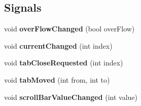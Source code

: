 \subsection*{Signals}
\begin{DoxyCompactItemize}
\item 
\hypertarget{class_combo_tab_bar_a94f5ffd04222be4711aa86c43dd8c2c8}{
void {\bfseries overFlowChanged} (bool overFlow)}
\label{class_combo_tab_bar_a94f5ffd04222be4711aa86c43dd8c2c8}

\item 
\hypertarget{class_combo_tab_bar_a809f0e76133375268a91fab6764f8974}{
void {\bfseries currentChanged} (int index)}
\label{class_combo_tab_bar_a809f0e76133375268a91fab6764f8974}

\item 
\hypertarget{class_combo_tab_bar_a109612f4651a809579d58e214693ec4b}{
void {\bfseries tabCloseRequested} (int index)}
\label{class_combo_tab_bar_a109612f4651a809579d58e214693ec4b}

\item 
\hypertarget{class_combo_tab_bar_a996feb2cdfac31b11b4862a889ca1578}{
void {\bfseries tabMoved} (int from, int to)}
\label{class_combo_tab_bar_a996feb2cdfac31b11b4862a889ca1578}

\item 
\hypertarget{class_combo_tab_bar_a4f8d44211878ebcbaa83c6f410a6d6c3}{
void {\bfseries scrollBarValueChanged} (int value)}
\label{class_combo_tab_bar_a4f8d44211878ebcbaa83c6f410a6d6c3}

\end{DoxyCompactItemize}
